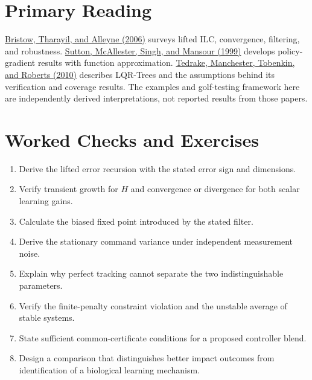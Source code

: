 \documentclass[12pt, openany]{book}
\theoremstyle{plain}
\begin{document}
\begin{samepage}
\section{Primary Reading}

\href{https://www.diag.uniroma1.it/~deluca/rob2_en/A_survey_of_iterative_learning_control_CSMag_2006.pdf}{Bristow, Tharayil, and Alleyne (2006)} surveys lifted ILC, convergence, filtering, and robustness.
\href{https://proceedings.neurips.cc/paper/1999/file/464d828b85b0bed98e80ade0a5c43b0f-Paper.pdf}{Sutton, McAllester, Singh, and Mansour (1999)} develops policy-gradient results with function approximation.
\href{https://groups.csail.mit.edu/robotics-center/public_papers/Tedrake10.pdf}{Tedrake, Manchester, Tobenkin, and Roberts (2010)} describes LQR-Trees and the assumptions behind its verification and coverage results.
The examples and golf-testing framework here are independently derived interpretations, not reported results from those papers.

\section{Worked Checks and Exercises}

\begin{enumerate}[itemsep=0.25em,parsep=0pt]
\item Derive the lifted error recursion with the stated error sign and dimensions.
\item Verify transient growth for $H$ and convergence or divergence for both scalar learning gains.
\item Calculate the biased fixed point introduced by the stated filter.
\item Derive the stationary command variance under independent measurement noise.
\item Explain why perfect tracking cannot separate the two indistinguishable parameters.
\item Verify the finite-penalty constraint violation and the unstable average of stable systems.
\item State sufficient common-certificate conditions for a proposed controller blend.
\item Design a comparison that distinguishes better impact outcomes from identification of a biological learning mechanism.
\end{enumerate}
\end{samepage}
\clearpage
\endgroup
\end{document}
